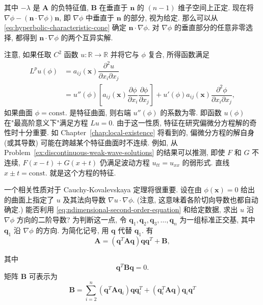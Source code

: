 其中 $-\lambda$ 是 $\bm{A}$ 的负特征值, $\bm{B}$ 在垂直于 $\bm{n}$ 的 $(n-1)$ 维子空间上正定. 现在将 $\nabla\phi-(\bm{n}\cdot\nabla\phi)\bm{n}$, 即 $\nabla\phi$ 中垂直于 $\bm{n}$ 的部分, 视为给定. 那么可以从 \eqref{eq:hyperbolic-characteristic-cone} 确定 $\bm{n}\cdot\nabla\phi$. 对 $\nabla\phi$ 的垂直部分的任意非零选择, 都得到 $\bm{n}\cdot\nabla\phi$ 的两个互异实解.

注意, 如果任取 $C^2$ 函数 $u:\mathbb{R}\to\mathbb{R}$ 并将它与 $\phi$ 复合, 所得函数满足
\begin{equation}\label{eq:characteristic-composed-function}
\begin{aligned}
L^pu(\phi)&=a_{ij}(\bm{x})\dfrac{\partial^2u}{\partial x_i\partial x_j}\\
&=u''(\phi)\left[a_{ij}(\bm{x})\dfrac{\partial\phi}{\partial x_i}\dfrac{\partial\phi}{\partial x_j}\right]
+u'(\phi)a_{ij}(\bm{x})\dfrac{\partial^2\phi}{\partial x_i\partial x_j},
\end{aligned}
\end{equation}
如果曲面 $\phi=\mathrm{const.}$ 是特征曲面, 则右端 $u''(\phi)$ 的系数为零. 即函数 $u(\phi)$ 在"最高阶意义下"满足方程 $Lu=0$. 由于这一性质, 特征在研究偏微分方程解的奇性时十分重要. 如 Chapter~\ref{chap:local-existence} 将看到的, 偏微分方程的解自身 (或其导数) 可能在跨越某个特征曲面时不连续. 例如, 从 Problem~\ref{ex:discontinuous-weak-wave-solutions} 的结果可以推测, 即使 $F$ 和 $G$ 不连续, $F(x-t)+G(x+t)$ 仍满足波动方程 $u_{tt}=u_{xx}$ 的弱形式. 直线 $x\pm t=\mathrm{const.}$ 就是这个方程的特征.

一个相关性质对于 Cauchy-Kovalevskaya 定理将很重要. 设在由 $\phi(\bm{x})=0$ 给出的曲面上指定了 $u$ 及其法向导数 $\nabla u\cdot\nabla\phi$. (注意, 这意味着各阶切向导数也都自动确定.) 能否利用 \eqref{eq:ndimensional-second-order-equation} 和给定数据, 求出 $u$ 沿 $\nabla\phi$ 方向的二阶导数? 为判断这一点, 令 $\bm{q}_1,\bm{q}_2,\bm{q}_3,\ldots,\bm{q}_n$ 为一组标准正交基, 其中 $\bm{q}_1$ 沿 $\nabla\phi$ 的方向. 为简化记号, 用 $\bm{q}$ 代替 $\bm{q}_1$. 有
\begin{equation}\label{eq:normal-direction-matrix-decomposition}
\bm{A}=(\bm{q}^T\bm{A}\bm{q})\bm{q}\bm{q}^T+\bm{B},
\end{equation}


其中
\begin{equation}\label{eq:remainder-normal-component-zero}
\bm{q}^T\bm{B}\bm{q}=0.
\end{equation}
矩阵 $\bm{B}$ 可表示为
\begin{equation}\label{eq:remainder-matrix-representation-first}
\bm{B}=\sum_{i=2}^n(\bm{q}^T\bm{A}\bm{q}_i)\bm{q}\bm{q}_i^T+(\bm{q}_i^T\bm{A}\bm{q})\bm{q}_i\bm{q}^T
\end{equation}

